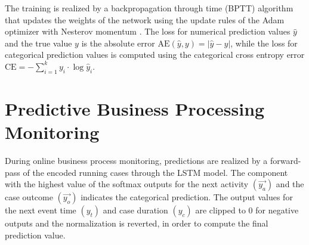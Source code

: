 The training is realized by a backpropagation through time (BPTT) algorithm that updates the weights of the network using the update rules of the Adam optimizer with Nesterov momentum \cite{dozat2016incorporating}.
The loss for numerical prediction values $\hat{y}$ and the true value $y$ is the absolute error $\text{AE}(\hat{y},y)=|\hat{y} - y|$, while the loss for categorical prediction values is computed using the categorical cross entropy error $\text{CE} = - \sum_{i=1}^{k} y_i \cdot \log \hat{y}_i$.


\section{Predictive Business Processing Monitoring}

During online business process monitoring, predictions are realized by a forward-pass of the encoded running cases through the LSTM model.
The component with the highest value of the softmax outputs for the next activity $(\vec{y_a})$ and the case outcome $(\vec{y_o})$ indicates the categorical prediction.
The output values for the next event time $(y_t)$ and case duration  $(y_c)$ are clipped to 0 for negative outputs and the normalization is reverted, in order to compute the final prediction value.
